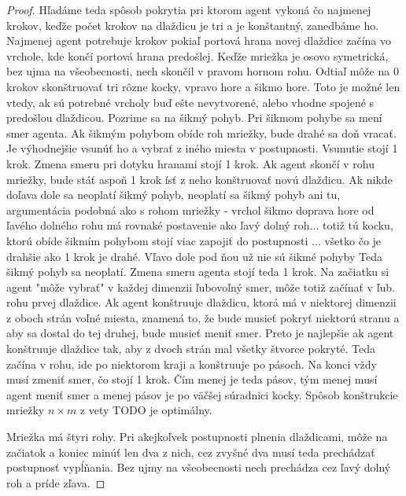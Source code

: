 \begin{proof}
Hľadáme teda spôsob pokrytia pri ktorom agent vykoná čo najmenej krokov,
keďže počet krokov na dlaždicu je tri a je konštantný, zanedbáme ho.
Najmenej agent potrebuje krokov pokiaľ portová hrana novej dlaždice začína
vo vrchole, kde končí portová hrana predošlej.
Keďže mriežka je osovo symetrická, bez ujma na všeobecnosti, nech skončil v
pravom hornom rohu. Odtiaľ môže na 0 krokov skonštruovať tri rôzne kocky, 
vpravo hore a šikmo hore. Toto je možné len vtedy, ak sú potrebné vrcholy
buď ešte nevytvorené, alebo vhodne spojené s predošlou dlaždicou.
Pozrime sa na šikmý pohyb. 
Pri šikmom pohybe sa mení smer agenta. Ak šikmým pohybom obíde roh mriežky,
bude drahé sa doň vracať. Je výhodnejšie vsunúť ho a vybrať z iného miesta v
postupnosti. Vsunutie stojí 1 krok.
Zmena smeru pri dotyku hranami stojí 1 krok. Ak agent skončí v rohu mriežky,
bude stáť aspoň 1 krok ísť z neho konštruovať novú dlaždicu. Ak nikde doľava
dole sa neoplatí šikmý pohyb, neoplatí sa šikmý pohyb ani tu, argumentácia
podobná ako s rohom mriežky - vrchol šikmo doprava hore od ľavého dolného
rohu má rovnaké postavenie ako ľavý dolný roh... totiž tú kocku, ktorú obíde šikmím pohybom
stojí viac zapojiť do postupnosti ... všetko čo je drahšie ako 1 krok je
drahé. Vľavo dole pod ňou už nie sú šikmé pohyby
Teda šikmý pohyb sa neoplatí. Zmena smeru agenta stojí teda 1 krok. Na
začiatku si agent "môže vybrať" v každej dimenzii ľubovoľný smer, môže totiž
začínať v ľub. rohu prvej dlaždice.
Ak agent konštruuje dlaždicu, ktorá má v niektorej dimenzii z oboch strán
voľné miesta, znamená to, že bude musieť pokryť niektorú stranu a aby sa
dostal do tej druhej, bude musieť meniť smer. Preto je najlepšie ak agent
konštruuje dlaždice tak, aby z dvoch strán mal všetky štvorce pokryté. Teda
začína v rohu, ide po niektorom kraji a konštruuje po pásoch. Na konci vždy
musí zmeniť smer, čo stojí 1 krok. Čím menej je teda pásov, tým	menej musí
agent meniť smer a menej pásov je po väčšej súradnici kocky.
Spôsob konštrukcie mriežky $n \times m$ z vety TODO je optimálny.





Mriežka má štyri rohy. Pri akejkoľvek postupnosti plnenia dlaždicami, môže
na začiatok a koniec minúť len dva z nich, cez zvyšné dva musí teda
prechádzať postupnosť vypĺňania. Bez ujmy na všeobecnosti nech prechádza cez
ľavý dolný roh a príde zľava.

\end{proof}
\fi


